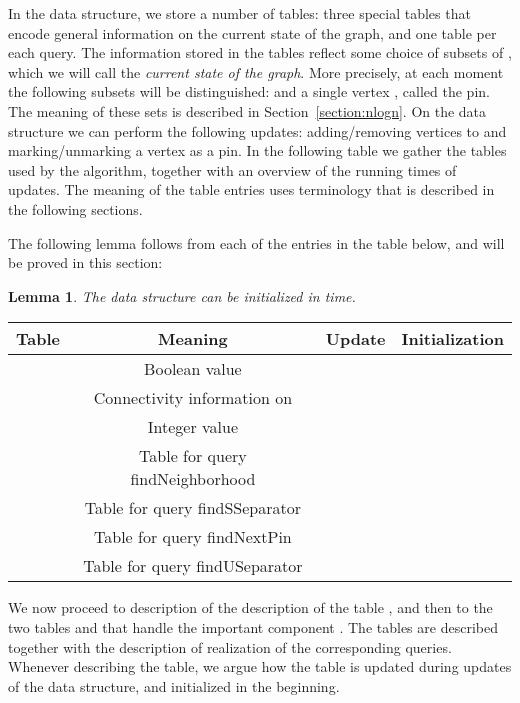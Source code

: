 \documentclass[a4paper,11pt]{article}
\newtheorem{lemma}{Lemma}[section]
\theoremstyle{definition}
\theoremstyle{remark}
\newcommand{\qnei}{\textnormal{findNeighborhood}}
\newcommand{\qUsep}{\textnormal{findUSeparator}}
\newcommand{\qSsep}{\textnormal{findSSeparator}}
\newcommand{\qpin}{\textnormal{findNextPin}}
\begin{document}
In the data structure, we store a number of tables: three special
tables that encode general information on the current state of the
graph, and one table per each query.  The information stored in the
tables reflect some choice of subsets of , which we will call the
{\emph{current state of the graph}}.  More precisely, at each moment
the following subsets will be distinguished:  and a single
vertex , called the pin.  The meaning of these sets is described
in Section~\ref{section:nlogn}. On the data structure we can perform
the following updates: adding/removing vertices to  and
marking/unmarking a vertex as a pin.  In the following table we gather
the tables used by the algorithm, together with an overview of the
running times of updates.  The meaning of the table entries uses
terminology that is described in the following sections.

The following lemma follows from each of the entries in the table
below, and will be proved in this section:
\begin{lemma}
  \label{lemma:ds:init-time}
  The data structure can be initialized in  time.
\end{lemma}

\vskip 0.3cm

\noindent\begin{tabular}{| c | c | c | c |}
\hline
{\bf{Table}} & {\bf{Meaning}} & {\bf{Update}} & {\bf{Initialization}} \\
\hline
 & Boolean value  &  &  \\
\hline
 & Connectivity information on  &  &  \\
\hline
 & Integer value  &  &  \\
\hline
 & Table for query \qnei &  &  \\
\hline
 & Table for query \qSsep &  &  \\
\hline
 & Table for query \qpin &  &  \\
\hline
 & Table for query \qUsep &  &  \\
\hline
\end{tabular}

\vskip 0.3cm

We now proceed to description of the description of the table , and
then to the two tables  and  that handle the important
component .  The tables  are described together with the
description of realization of the corresponding queries.  Whenever
describing the table, we argue how the table is updated during updates
of the data structure, and initialized in the beginning.
\end{document}
